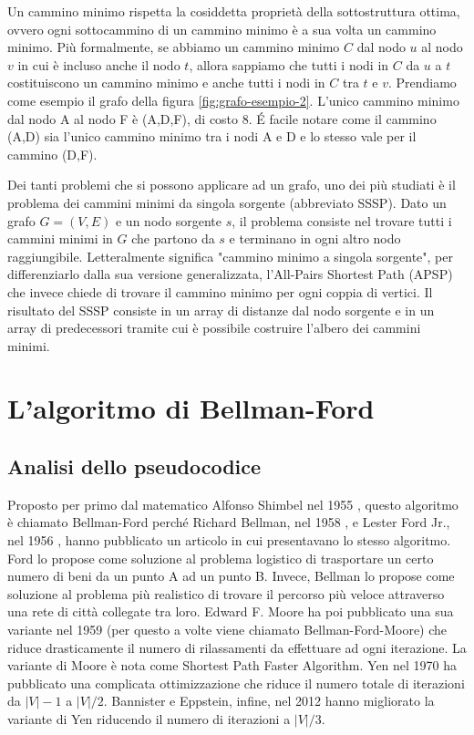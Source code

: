 \documentclass[12pt,a4paper,oneside]{book}
\begin{document}
	Un cammino minimo rispetta la cosiddetta proprietà della sottostruttura ottima, ovvero ogni sottocammino di un cammino minimo è a sua volta un cammino minimo. Più formalmente, se abbiamo un cammino minimo $C$ dal nodo $u$ al nodo $v$ in cui è incluso anche il nodo $t$, allora sappiamo che tutti i nodi in $C$ da $u$ a $t$ costituiscono un cammino minimo e anche tutti i nodi in $C$ tra $t$ e $v$. Prendiamo come esempio il grafo della figura \ref{fig:grafo-esempio-2}. L'unico cammino minimo dal nodo A al nodo F è (A,D,F), di costo 8. \'E facile notare come il cammino (A,D) sia l'unico cammino minimo tra i nodi A e D e lo stesso vale per il cammino (D,F).
	
	Dei tanti problemi che si possono applicare ad un grafo, uno dei più studiati è il problema dei cammini minimi da singola sorgente (abbreviato SSSP). Dato un grafo $G=(V,E)$ e un nodo sorgente $s$, il problema consiste nel trovare tutti i cammini minimi in $G$ che partono da $s$ e terminano in ogni altro nodo raggiungibile. Letteralmente significa "cammino minimo a singola sorgente", per differenziarlo dalla sua versione generalizzata, l'All-Pairs Shortest Path (APSP) che invece chiede di trovare il cammino minimo per ogni coppia di vertici. Il risultato del SSSP consiste in un array di distanze dal nodo sorgente e in un array di predecessori tramite cui è possibile costruire l'albero dei cammini minimi.
	
	\chapter{L'algoritmo di Bellman-Ford}
	\label{chap:analisi}
	\section{Analisi dello pseudocodice}
	Proposto per primo dal matematico Alfonso Shimbel nel 1955 \cite{Shimbel1955}, questo algoritmo è chiamato Bellman-Ford perché Richard Bellman, nel 1958 \cite{Bellman1958}, e Lester Ford Jr., nel 1956 \cite{Ford1956}, hanno pubblicato un articolo in cui presentavano lo stesso algoritmo. Ford lo propose come soluzione al problema logistico di trasportare un certo numero di beni da un punto A ad un punto B. Invece, Bellman lo propose come soluzione al problema più realistico di trovare il percorso più veloce attraverso una rete di città collegate tra loro. Edward F. Moore ha poi pubblicato una sua variante nel 1959 \cite{Moore1959} (per questo a volte viene chiamato Bellman-Ford-Moore) che riduce drasticamente il numero di rilassamenti da effettuare ad ogni iterazione. La variante di Moore è nota come Shortest Path Faster Algorithm. Yen nel 1970 \cite{Yen1970} ha pubblicato una complicata ottimizzazione che riduce il numero totale di iterazioni da $|V|-1$ a $|V|/2$. Bannister e Eppstein, infine, nel 2012 \cite{Bannister2012} hanno migliorato la variante di Yen riducendo il numero di iterazioni a $|V|/3$.
	
\end{document}
